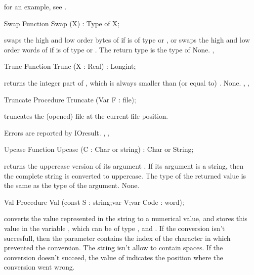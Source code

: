 \documentclass{report}
\begin{document}
for an example, see .
\begin{function}{Swap}
\Declaration
Function Swap (X) : Type of X;

\Description
{} swaps the high and low order bytes of  if  is of
type  or , or swaps the high and low order words of
 if  is of type  or .
The return type is the type of 
\Errors
None.
\SeeAlso
{}, 
\end{function}
\html{}
\begin{function}{Trunc}
\Declaration
Function Trunc (X : Real) : Longint;

\Description
{} returns the integer part of , 
which is always smaller than (or equal to)  .
\Errors
None.
\SeeAlso
{}, , 
\end{function}
\html{}
\begin{procedure}{Truncate}
\Declaration
Procedure Truncate (Var F : file);

\Description
{} truncates the (opened) file  at the current file
position.

\Errors
Errors are reported by IOresult.
\SeeAlso
{}, ,
\end{procedure}
\html{}
\begin{function}{Upcase}
\Declaration
Function Upcase (C : Char or string) : Char or String;

\Description
{} returns the uppercase version of its argument .
If its argument is a string, then the complete string is converted to 
uppercase. The type of the returned value is the same as the type of the
argument.
\Errors
None.
\SeeAlso
{}
\end{function}
\html{}
\begin{procedure}{Val}
\Declaration
Procedure Val (const S : string;var V;var Code : word);

\Description
{} converts the value represented in the string  to a numerical
value, and stores this value in the variable , which 
can be of type ,  and .
If the conversion isn't succesfull, then the parameter  contains
the index of the character in  which prevented the conversion.
The string  isn't allow to contain spaces.
\Errors
If the conversion doesn't succeed, the value of  indicates the
position where the conversion went wrong.
\SeeAlso
{}
\end{procedure}
\end{document}
